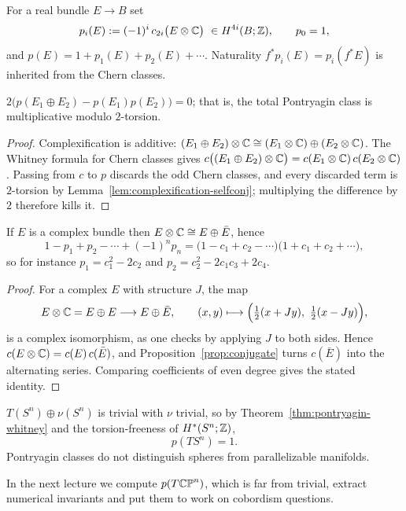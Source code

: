 \begin{definition}
For a real bundle $E\to B$ set
\[
p_i(E):=(-1)^i\,c_{2i}\big(E\otimes\mathbb{C}\big)\ \in H^{4i}(B;\mathbb{Z}),
\qquad p_0=1,
\]
and $p(E)=1+p_1(E)+p_2(E)+\cdots$. Naturality
$f^*p_i(E)=p_i(f^*E)$ is inherited from the Chern classes.
\end{definition}

\begin{theorem}\label{thm:pontryagin-whitney}
$2\big(p(E_1\oplus E_2)-p(E_1)p(E_2)\big)=0$; that is, the total Pontryagin
class is multiplicative modulo $2$-torsion.
\end{theorem}

\begin{proof}
Complexification is additive:
$(E_1\oplus E_2)\otimes\mathbb{C}\cong(E_1\otimes\mathbb{C})\oplus(E_2\otimes\mathbb{C})$. The Whitney
formula for Chern classes gives
$c\big((E_1\oplus E_2)\otimes\mathbb{C}\big)=c(E_1\otimes\mathbb{C})\,c(E_2\otimes\mathbb{C})$. Passing
from $c$ to $p$ discards the odd Chern classes, and every discarded term is
$2$-torsion by Lemma~\ref{lem:complexification-selfconj}; multiplying the
difference by $2$ therefore kills it.
\end{proof}

\begin{corollary}\label{cor:pontryagin-of-complex}
If $E$ is a complex bundle then $E\otimes\mathbb{C}\cong E\oplus\bar E$, hence
\[
1-p_1+p_2-\cdots+(-1)^np_n
=\big(1-c_1+c_2-\cdots\big)\big(1+c_1+c_2+\cdots\big),
\]
so for instance $p_1=c_1^2-2c_2$ and $p_2=c_2^2-2c_1c_3+2c_4$.
\end{corollary}

\begin{proof}
For a complex $E$ with structure $J$, the map
\[
E\otimes\mathbb{C}=E\oplus E\longrightarrow E\oplus\bar E,
\qquad
(x,y)\longmapsto\Big(\tfrac12(x+Jy),\ \tfrac12(x-Jy)\Big),
\]
is a complex isomorphism, as one checks by applying $J$ to both sides. Hence
$c(E\otimes\mathbb{C})=c(E)\,c(\bar E)$, and
Proposition~\ref{prop:conjugate} turns $c(\bar E)$ into the alternating series.
Comparing coefficients of even degree gives the stated identity.
\end{proof}

\begin{example}
$T(S^n)\oplus\nu(S^n)$ is trivial with $\nu$ trivial, so by
Theorem~\ref{thm:pontryagin-whitney} and the torsion-freeness of $H^*(S^n;\mathbb{Z})$,
\[
p(TS^n)=1 .
\]
Pontryagin classes do not distinguish spheres from parallelizable manifolds.
\end{example}

In the next lecture we compute $p(T\mathbb{CP}^n)$, which is far from trivial, extract
numerical invariants and put them to work on cobordism questions.
